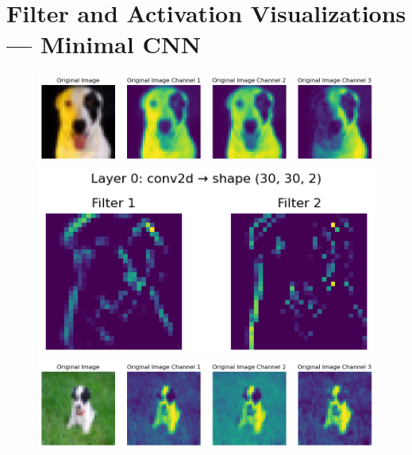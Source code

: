 \section{Filter and Activation Visualizations — Minimal CNN}
\label{sec:Filter and Activation Visualizations — Minimal CNN}

    \begin{figure}[H]
        \centering
        \begin{minipage}[t]{0.55\textwidth}
            \vspace{-22.5em}
            \includegraphics[width=\linewidth]{Plots/Appendix_B/cifar_image.png}
            \centering{}
            \vspace{1em}

            \includegraphics[width=0.8\linewidth]{Plots/Appendix_B/cifar_image_after_filter.png}
            \centering{}
            \vspace{1em}

            \includegraphics[width=\linewidth]{Plots/Appendix_B/imageNet_image.png}
            \centering{}
            \vspace{1em}


\end{minipage}
\end{figure}
